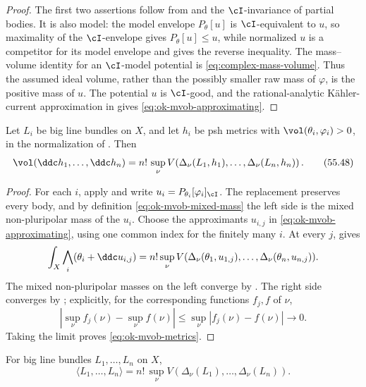 \begin{proof}
The first two assertions follow from
 and the \(\cI\)-invariance of partial
bodies.  It is also model: the model envelope
\(P_\theta[u]\) is \(\cI\)-equivalent to \(u\), so maximality of the
\(\cI\)-envelope gives \(P_\theta[u]\leq u\), while normalized \(u\) is a
competitor for its model envelope and gives the reverse inequality.  The
mass--volume identity for an \(\cI\)-model potential is
\eqref{eq:complex-mass-volume}.  Thus the assumed ideal volume, rather than
the possibly smaller raw mass of \(\varphi\), is the positive mass of
\(u\).  The potential \(u\) is \(\cI\)-good, and the rational-analytic
K\"ahler-current approximation in \cite[Theorem~7.1.1]{XiaBook} gives
\eqref{eq:ok-mvob-approximating}.
\end{proof}

\begin{theorem}\label{thm:ok-mvob-metrics}
Let \(L_i\) be big line bundles on \(X\), and let \(h_i\) be psh metrics
with \(\vol(\theta_i,\varphi_i)>0\), in the normalization of
.  Then
\[
 \vol(\ddc h_1,\dots,\ddc h_n)
 =n!\,\sup_\nu V\!\left(
    \Delta_\nu(L_1,h_1),\dots,\Delta_\nu(L_n,h_n)\right).
\tag{55.48}\label{eq:ok-mvob-metrics}
\]
\end{theorem}

\begin{proof}
For each \(i\), apply  and write
\(u_i=P_{\theta_i}[\varphi_i]_{\cI}\).  The replacement preserves every
body, and by definition \eqref{eq:ok-mvob-mixed-mass} the left side is the
mixed non-pluripolar mass of the \(u_i\).  Choose the approximants
\(u_{i,j}\) in \eqref{eq:ok-mvob-approximating}, using one common index for
the finitely many \(i\).  At every \(j\),
 gives
\[
 \int_X\bigwedge_i(\theta_i+\ddc u_{i,j})
 =n!\sup_\nu V(\Delta_\nu(\theta_1,u_{1,j}),\ldots,
                    \Delta_\nu(\theta_n,u_{n,j})).
\]
The mixed non-pluripolar masses on the left converge by
\cite[Theorem~6.2.1]{XiaBook}.  The right side converges by
; explicitly, for the corresponding functions
\(f_j,f\) of \(\nu\),
\[
 \left|\sup_\nu f_j(\nu)-\sup_\nu f(\nu)\right|
 \leq\sup_\nu|f_j(\nu)-f(\nu)|\longrightarrow0.
\]
Taking the limit proves \eqref{eq:ok-mvob-metrics}.
\end{proof}

\begin{theorem}\label{thm:ok-mvob-line-bundles}
For big line bundles \(L_1,\ldots,L_n\) on \(X\),
\[
 \langle L_1,\dots,L_n\rangle
 =n!\,\sup_\nu V\!\left(
     \Delta_\nu(L_1),\dots,\Delta_\nu(L_n)\right).
\tag{55.49}\label{eq:ok-mvob-line-bundles}
\]
\end{theorem}

